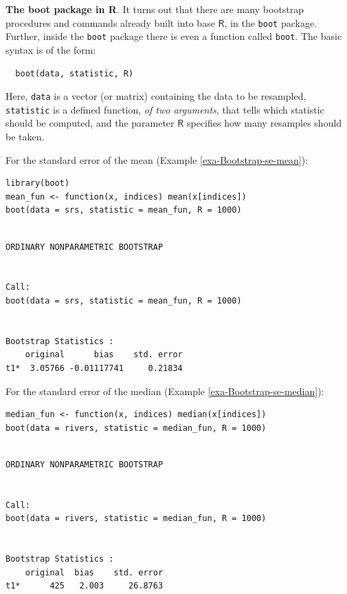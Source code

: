 \documentclass[captions=tableheading]{scrbook}
\begin{document}
\begin{example}
\textbf{The boot package in R}. It turns out that there are many bootstrap procedures and commands already built into base \(\mathsf{R}\), in the \texttt{boot} package. Further, inside the \texttt{boot} package there is even a function called \texttt{boot}. The basic syntax is of the form:

\begin{verbatim}
  boot(data, statistic, R)
\end{verbatim}

\end{example}
 Here, \texttt{data} is a vector (or matrix) containing the data to be resampled, \texttt{statistic} is a defined function, \emph{of two arguments}, that tells which statistic should be computed, and the parameter \(\mathsf{R}\) specifies how many resamples should be taken.

For the standard error of the mean (Example \ref{exa-Bootstrap-se-mean}):


\lstset{language=R}
\begin{lstlisting}
library(boot)
mean_fun <- function(x, indices) mean(x[indices])
boot(data = srs, statistic = mean_fun, R = 1000)
\end{lstlisting}


\begin{verbatim}
 
ORDINARY NONPARAMETRIC BOOTSTRAP


Call:
boot(data = srs, statistic = mean_fun, R = 1000)


Bootstrap Statistics :
    original      bias    std. error
t1*  3.05766 -0.01117741     0.21834
\end{verbatim}

For the standard error of the median (Example \ref{exa-Bootstrap-se-median}):


\lstset{language=R}
\begin{lstlisting}
median_fun <- function(x, indices) median(x[indices])
boot(data = rivers, statistic = median_fun, R = 1000)
\end{lstlisting}


\begin{verbatim}

ORDINARY NONPARAMETRIC BOOTSTRAP


Call:
boot(data = rivers, statistic = median_fun, R = 1000)


Bootstrap Statistics :
    original  bias    std. error
t1*      425   2.003     26.8763
\end{verbatim}
\end{document}

